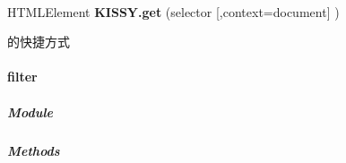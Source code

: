 \documentclass[letterpaper,10pt,english]{sphinxmanual}
\begin{document}

\begin{fulllineitems}
\label{api/core/dom/get:DOM.KISSY.get}~
\begin{DUlineblock}{0em}
\item[] HTMLElement \textbf{KISSY.get} (selector {[},context=document{]} )
\end{DUlineblock}

{\hyperref[api/core/dom/get:DOM.get]{}} 的快捷方式

\end{fulllineitems}



\paragraph{filter}
\label{api/core/dom/filter:filter}\label{api/core/dom/filter::doc}

\subparagraph{Module}
\label{api/core/dom/filter:module}\begin{quote}

{\hyperref[api/core/dom/index:module-DOM]{}}
\end{quote}


\subparagraph{Methods}
\label{api/core/dom/filter:methods}
\end{document}
